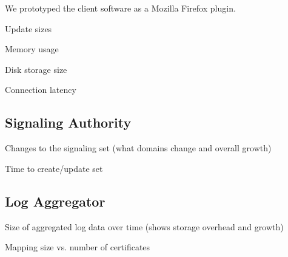 We prototyped the client software as a Mozilla Firefox plugin.

\begin{compactitem}
\item Update sizes
\item Memory usage
\item Disk storage size
\item Connection latency
\end{compactitem}



\subsection{Signaling Authority}

\begin{compactitem}
\item Changes to the signaling set (what domains change and overall growth)
\item Time to create/update set
\end{compactitem}

\subsection{Log Aggregator}

\begin{compactitem}
\item Size of aggregated log data over time (shows storage overhead and growth)
\item Mapping size vs. number of certificates
\end{compactitem}




